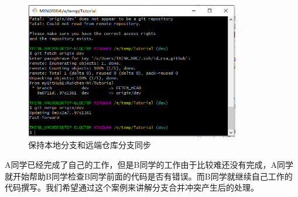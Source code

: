 \documentclass[a4paper,14pt]{article}
\begin{document}
\begin{enumerate}[1. ]
\begin{figure}[h]
\centering
\includegraphics[height=6cm]{figure/step14}
\caption{保持本地分支和远端仓库分支同步}
\end{figure}
\end{enumerate}

\newpage
A同学已经完成了自己的工作，但是B同学的工作由于比较难还没有完成，A同学就开始帮助B同学检查B同学前面的代码是否有错误。而B同学就继续自己工作的代码撰写。我们希望通过这个案例来讲解分支合并冲突产生后的处理。
\end{document}
